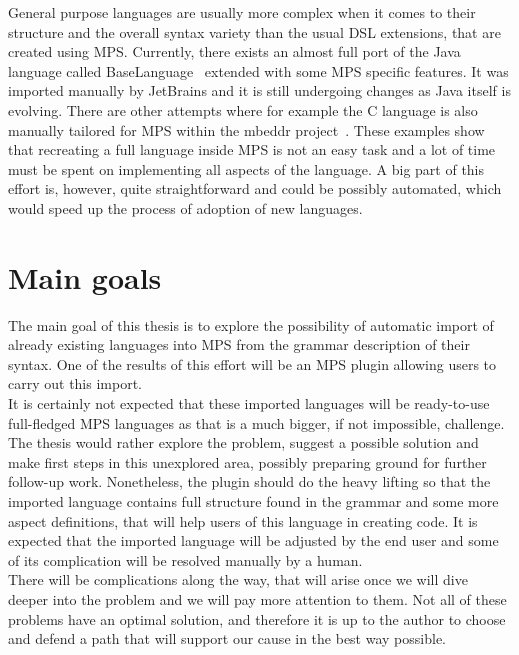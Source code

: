 General purpose languages are usually more complex when it comes to their structure and the overall syntax variety than the usual DSL extensions, that are created using MPS.
Currently, there exists an almost full port of the Java language called BaseLanguage~\cite{BaseLanguage} extended with some MPS specific features.
It was imported manually by JetBrains and it is still undergoing changes as Java itself is evolving.
There are other attempts where for example the C language is also manually tailored for MPS within the mbeddr project~\cite{mbeddr}.
These examples show that recreating a full language inside MPS is not an easy task and a lot of time must be spent on implementing all aspects of the language.
A big part of this effort is, however, quite straightforward and could be possibly automated, which would speed up the process of adoption of new languages.

\section{Main goals}
\label{chap:main_goals}

The main goal of this thesis is to explore the possibility of automatic import of already existing languages into MPS from the grammar description of their syntax.
One of the results of this effort will be an MPS plugin allowing users to carry out this import.
\\

It is certainly not expected that these imported languages will be ready-to-use full-fledged MPS languages as that is a much bigger, if not impossible, challenge.
The thesis would rather explore the problem, suggest a possible solution and make first steps in this unexplored area, possibly preparing ground for further follow-up work.
Nonetheless, the plugin should do the heavy lifting so that the imported language contains full structure found in the grammar and some more aspect definitions, that will help users of this language in creating code.
It is expected that the imported language will be adjusted by the end user and some of its complication will be resolved manually by a human.
\\

There will be complications along the way, that will arise once we will dive deeper into the problem and we will pay more attention to them.
Not all of these problems have an optimal solution, and therefore it is up to the author to choose and defend a path that will support our cause in the best way possible.
\\

